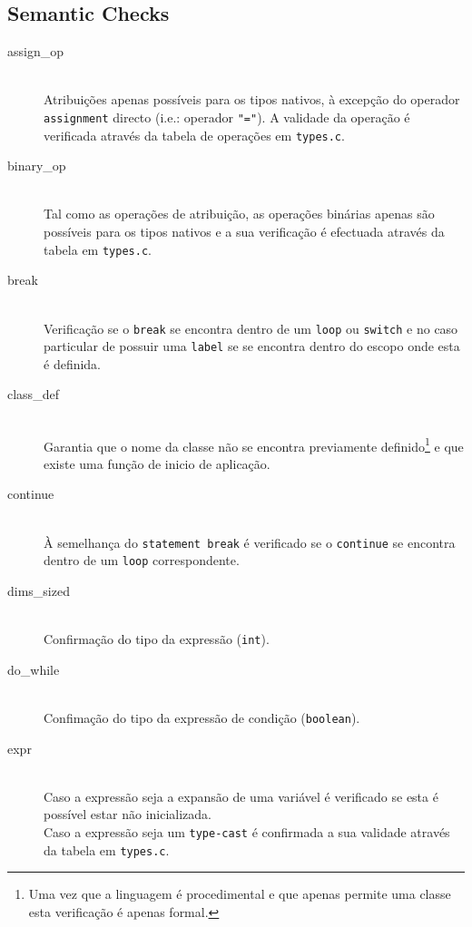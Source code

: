 \documentclass[a4paper]{article}
\begin{document}
\subsection{Semantic Checks}
\begin{description}
	\item [assign\_op] \hfill \\
		Atribuições apenas possíveis para os tipos nativos, à excepção do operador \texttt{assignment} directo (i.e.: operador \texttt{"="}).
		A validade da operação é verificada através da tabela de operações em \texttt{types.c}.

	\item [binary\_op] \hfill \\
		Tal como as operações de atribuição, as operações binárias apenas são possíveis para os tipos nativos e a sua verificação
		é efectuada através da tabela em \texttt{types.c}.

	\item [break] \hfill \\
		Verificação se o \texttt{break} se encontra dentro de um \texttt{loop} ou \texttt{switch}
		e no caso particular de possuir uma \texttt{label} se se encontra dentro do escopo onde esta é definida.

	\item [class\_def] \hfill \\
		Garantia que o nome da classe não se encontra previamente definido\footnote[1]{Uma vez que a linguagem é procedimental e que apenas permite uma classe esta verificação é apenas formal.} e que existe uma função
		de inicio de aplicação.

	\item [continue] \hfill \\
		À semelhança do \texttt{statement break} é verificado se o \texttt{continue} se encontra dentro de um \texttt{loop} correspondente.

	\item [dims\_sized] \hfill \\
		Confirmação do tipo da expressão (\texttt{int}).

	\item [do\_while] \hfill \\
		Confimação do tipo da expressão de condição (\texttt{boolean}).

	\item [expr] \hfill \\
		Caso a expressão seja a expansão de uma variável é verificado se esta é possível estar não inicializada. \\
		Caso a expressão seja um \texttt{type-cast} é confirmada a sua validade através da tabela em \texttt{types.c}.


\end{description}
\end{document}
